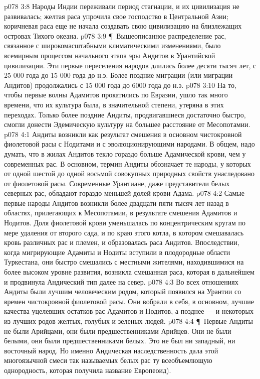 \vs p078 3:8 Народы Индии переживали период стагнации, и их цивилизация не развивалась; желтая раса упрочила свое господство в Центральной Азии; коричневая раса еще не начала создавать свою цивилизацию на близлежащих островах Тихого океана.
\vs p078 3:9 \P\ Вышеописанное распределение рас, связанное с широкомасштабными климатическими изменениями, было всемирным процессом начального этапа эры Андитов в Урантийской цивилизации. Эти первые переселения народов длились более десяти тысяч лет, с 25 000 года до 15 000 года до н.э. Более поздние миграции (или миграции Андитов) продолжались с 15 000 года до 6000 года до н.э.
\vs p078 3:10 На то, чтобы первые волны Адамитов прокатились по Евразии, ушло так много времени, что их культура была, в значительной степени, утеряна в этих переходах. Только более поздние Андиты, продвигавшиеся достаточно быстро, смогли донести Эдемическую культуру на большее расстояние от Месопотамии.
\vs p078 4:1 Андиты возникли как результат смешения в основном чистокровной фиолетовой расы с Нодитами и с эволюционирующими народами. В общем, надо думать, что в жилах Андитов текло гораздо больше Адамической крови, чем у современных рас. В основном, термин Андиты обозначает те народы, у которых от одной шестой до одной восьмой совокупных природных свойств унаследовано от фиолетовой расы. Современные Урантиане, даже представители белых северных рас, обладают гораздо меньшей долей крови Адама.
\vs p078 4:2 Самые первые народы Андитов возникли более двадцати пяти тысяч лет назад в областях, прилегающих к Месопотамии, в результате смешения Адамитов и Нодитов. Доля фиолетовой крови уменьшалась по концентрическим кругам по мере удаления от второго сада, и по краю этого котла, в котором смешавалась кровь различных рас и племен, и образовалась раса Андитов. Впоследствии, когда мигрирующие Адамиты и Нодиты вступили в плодородные области Туркестана, они быстро смешались с местными жителями, находившимися на более высоком уровне развития, возникла смешанная раса, которая в дальнейшем и продвинула Андический тип далее на север.
\vs p078 4:3 Во всех отношениях Андиты были лучшим человеческим родом, который появился на Урантии со времен чистокровной фиолетовой расы. Они вобрали в себя, в основном, лучшие качества уцелевших остатков рас Адамитов и Нодитов, а позднее --- и некоторых из лучших родов желтых, голубых и зеленых людей.
\vs p078 4:4 \P\ Первые Андиты не были Арийцами, они были предшественниками Арийцев. Они не были белыми, они были предшественниками белых. Это не был ни западный, ни восточный народ. Но именно Андическая наследственность дала этой многоязычной смеси так называемых белых рас ту всеобъемлющую однородность, которая получила название Европеоид).

